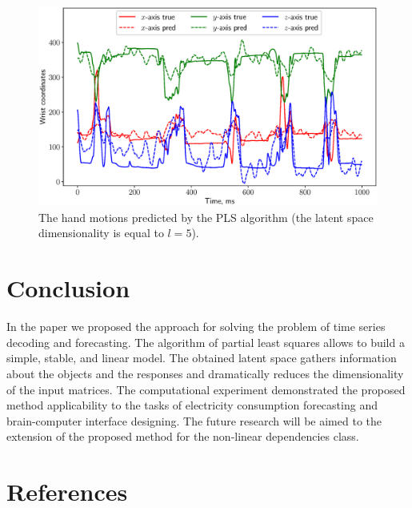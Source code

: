 \documentclass[preprint,12pt]{elsarticle}
\begin{document}
\begin{figure}[!h]
	\centering
	\includegraphics[width=\textwidth]{figs/ecog_prediction}
	\caption{The hand motions predicted by the PLS algorithm (the latent space dimensionality is equal to $l=5$).}
	\label{fig::ecog_prediction}
\end{figure}

\section{Conclusion}
In the paper we proposed the approach for solving the problem of time series decoding and forecasting. 
The algorithm of partial least squares allows to build a simple, stable, and linear model. 
The obtained latent space gathers information about the objects and the responses and dramatically reduces the dimensionality of the input matrices. 
The computational experiment demonstrated the proposed method applicability to the tasks of electricity consumption forecasting and brain-computer interface designing.
The future research will be aimed to the extension of the proposed method for the non-linear dependencies class.
\section*{References}


\end{document}
